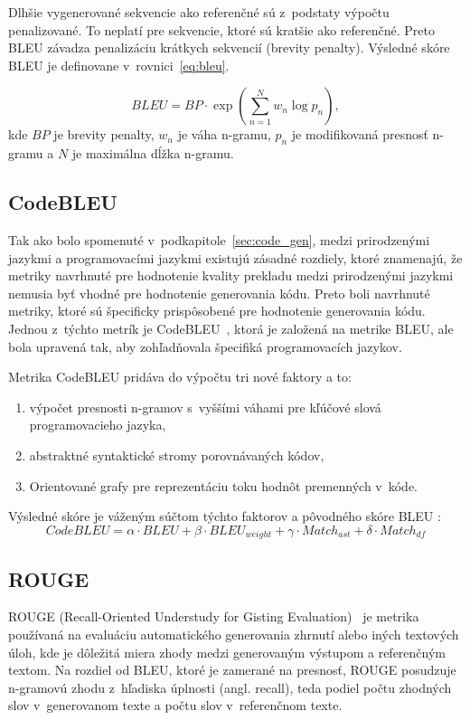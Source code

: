 Dlhšie vygenerované sekvencie ako referenčné sú z~podstaty výpočtu penalizované. To neplatí pre sekvencie, ktoré sú kratšie ako referenčné. Preto BLEU závadza penalizáciu krátkych sekvencií (brevity penalty). Výsledné skóre BLEU je definovane v~rovnici~\ref{eq:bleu}.

\begin{equation}\label{eq:bleu}
    BLEU = BP\cdot\exp\left(\sum_{n=1}^{N}w_n\log p_n\right),
\end{equation}
\noindent kde $BP$ je brevity penalty, $w_n$ je váha n-gramu, $p_n$ je modifikovaná presnosť n-gramu a $N$ je maximálna dĺžka n-gramu.

\subsection{CodeBLEU}

Tak ako bolo spomenuté v~podkapitole~\ref{sec:code_gen}, medzi prirodzenými jazykmi a programovacími jazykmi existujú zásadné rozdiely, ktoré znamenajú, že metriky navrhnuté pre hodnotenie kvality prekladu medzi prirodzenými jazykmi nemusia byť vhodné pre hodnotenie generovania kódu. Preto boli navrhnuté metriky, ktoré sú špecificky prispôsobené pre hodnotenie generovania kódu. Jednou z~týchto metrík je CodeBLEU~\cite{ren2020codebleu}, ktorá je založená na metrike BLEU, ale bola upravená tak, aby zohľadňovala špecifiká programovacích jazykov.

\noindent Metrika CodeBLEU pridáva do výpočtu tri nové faktory a to:
\begin{enumerate}
    \item výpočet presnosti n-gramov s~vyššími váhami pre kľúčové slová programovacieho jazyka,

    \item abstraktné syntaktické stromy porovnávaných kódov,

    \item Orientované grafy pre reprezentáciu toku hodnôt premenných v~kóde.
\end{enumerate}

\noindent Výsledné skóre je váženým súčtom týchto faktorov a pôvodného skóre BLEU :
\begin{equation}\label{eq:codebleu}
    CodeBLEU = \alpha\cdot BLEU + \beta\cdot BLEU_{weight} + \gamma\cdot Match_{ast} + \delta\cdot Match_{df}
\end{equation}

\subsection{ROUGE}
ROUGE (Recall-Oriented Understudy for Gisting Evaluation)~\cite{lin2004rouge} je metrika používaná na evaluáciu automatického generovania zhrnutí alebo iných textových úloh, kde je dôležitá miera zhody medzi generovaným výstupom a referenčným textom. Na rozdiel od BLEU, ktoré je zamerané na presnosť, ROUGE posudzuje n-gramovú zhodu z~hľadiska úplnosti (angl. recall), teda podiel počtu zhodných slov v~generovanom texte a počtu slov v~referenčnom texte.

